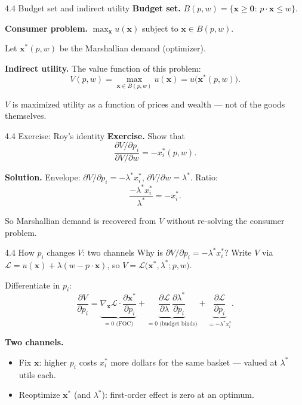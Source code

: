 \documentclass[11pt,aspectratio=169]{beamer}
\newcommand{\QFrame}[1]{\begin{frame}{#1 \quad {\small\textcolor{mAccent}{Together}}}}
\begin{document}
\begin{frame}{4.4 Budget set and indirect utility}
  \small
  \textbf{Budget set.} $B(p,w)=\{\mathbf{x}\geq\mathbf{0}:\,p\cdot\mathbf{x}\leq w\}$.
  
  \textbf{Consumer problem.} $\max_{\mathbf{x}} u(\mathbf{x})$ subject to $\mathbf{x}\in B(p,w)$.
  
  Let $\mathbf{x}^*(p,w)$ be the Marshallian demand (optimizer).
  
  \textbf{Indirect utility.} The value function of this problem:
  \[
    V(p,w)=\max_{\mathbf{x}\in B(p,w)} u(\mathbf{x})=u\bigl(\mathbf{x}^*(p,w)\bigr).
  \]
  
  $V$ is maximized utility as a function of prices and wealth --- not of the goods themselves.
\end{frame}

\QFrame{4.4 Exercise: Roy's identity}
  \small
  \textbf{Exercise.} Show that
  \[
    \frac{\partial V/\partial p_i}{\partial V/\partial w}=-x_i^*(p,w).
  \]

  \textbf{Solution.} Envelope: $\partial V/\partial p_i=-\lambda^* x_i^*$, $\partial V/\partial w=\lambda^*$.
  Ratio:
  \[
    \frac{-\lambda^* x_i^*}{\lambda^*}=-x_i^*.
  \]
  
  So Marshallian demand is recovered from $V$ without re-solving the consumer problem.
\end{frame}

\begin{frame}{4.4 How $p_i$ changes $V$: two channels}
  \small
  Why is $\partial V/\partial p_i=-\lambda^* x_i^*$? Write $V$ via
  $\mathcal{L}=u(\mathbf{x})+\lambda(w-p\cdot\mathbf{x})$, so
  $V=\mathcal{L}\bigl(\mathbf{x}^*,\lambda^*;p,w\bigr)$.
  
  Differentiate in $p_i$:
  \[
    \frac{\partial V}{\partial p_i}
    =\underbrace{\nabla_{\mathbf{x}}\mathcal{L}\cdot\frac{\partial\mathbf{x}^*}{\partial p_i}}_{=0\text{ (FOC)}}
    +\underbrace{\frac{\partial\mathcal{L}}{\partial\lambda}\,\frac{\partial\lambda^*}{\partial p_i}}_{=0\text{ (budget binds)}}
    +\underbrace{\frac{\partial\mathcal{L}}{\partial p_i}}_{=-\lambda^* x_i^*}.
  \]
  
  \textbf{Two channels.}
  \begin{itemize}
    \item Fix $\mathbf{x}$: higher $p_i$ costs $x_i^*$ more dollars for the same basket --- valued at $\lambda^*$ utils each.
    \item Reoptimize $\mathbf{x}^*$ (and $\lambda^*$): first-order effect is zero at an optimum.
  \end{itemize}
\end{frame}
\end{document}
